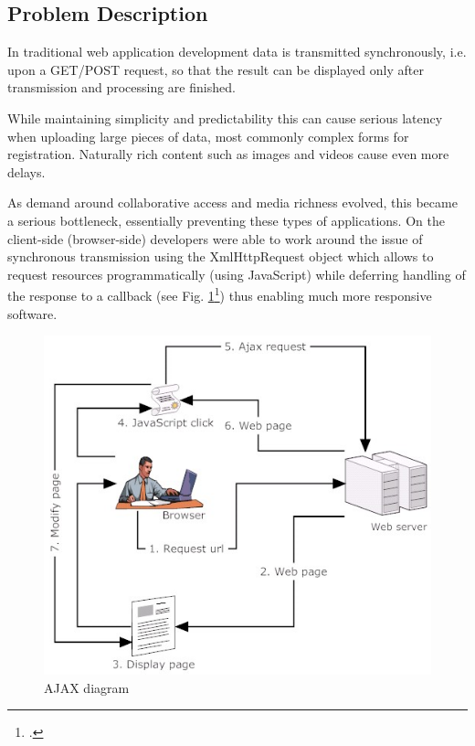 \subsection{Problem Description}

In traditional web application development data is transmitted synchronously,
i.e. upon a GET/POST request, so that the result can be displayed only after transmission
and processing are finished.

While maintaining simplicity and
predictability this can cause serious latency when uploading large pieces of
data, most commonly complex forms for registration. Naturally rich content such
as images and videos cause even more delays.

As demand around collaborative access and media richness evolved, this became a
serious bottleneck, essentially preventing these types of applications. On the
client-side (browser-side) developers were able to work around the issue of
synchronous transmission using the XmlHttpRequest object which allows to request
resources programmatically (using JavaScript) while
deferring handling of the response to a callback (see Fig. \ref{img_ajax}\footcite{img_ajax}) thus enabling much more responsive software.

\begin{figure}[hbtp]
\centering
\includegraphics[scale=0.5]{img/ajax-diagram}
\caption[AJAX diagram]{AJAX diagram\label{img_ajax}}
\end{figure}

